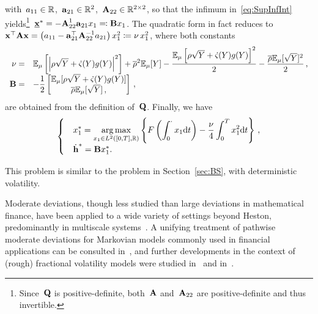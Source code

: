 with~$a_{11} \in\mathbb{R}$,~$\boldsymbol{\mathrm{a}}_{21}\in\mathbb{R}^{2}$,~$\boldsymbol{\mathrm{A}}_{22}\in\mathbb{R}^{2\times 2}$, so that the infimum in~\eqref{eq:SupInfInt} yields\footnote{Since~$\boldsymbol{\mathrm{Q}}$ is positive-definite, both~$\boldsymbol{\mathrm{A}}$ and~$\boldsymbol{\mathrm{A}}_{22}$ are positive-definite and thus invertible.}~${\underline{\boldsymbol{\mathrm{x}}}^{*} = - \boldsymbol{\mathrm{A}}_{22}^{1} \boldsymbol{\mathrm{a}}_{21} x_1 \eqqcolon \boldsymbol{\mathrm{B}} x_1}$. The quadratic form in fact reduces to~${\boldsymbol{\mathrm{x}}^\top \boldsymbol{\mathrm{A}} \boldsymbol{\mathrm{x}} = \left( a_{11} - \boldsymbol{\mathrm{a}}_{21}^\top \boldsymbol{\mathrm{A}}_{22}^{-1} a_{21} \right ) x_1^2 \coloneqq \nu\, x_1^2}$, where both constants
\begin{equation}\label{eq:ConstPDP}
\begin{array}{rl}
\nu = & \displaystyle 
\mathbb{E}_\mu\left[ \left| \rho\sqrt{Y} + \dot{\varsigma}(Y)g(Y)\right|^2 \right ] + \overline{\rho}^2\mathbb{E}_\mu[Y] - \frac{\mathbb{E}_\mu\left[ \rho\sqrt{Y} + \dot{\varsigma}(Y)g(Y)\right]^2}{2} - \frac{\overline{\rho}\mathbb{E}_\mu[\sqrt{Y}]^2}{2}\,, \\
\boldsymbol{\mathrm{B}} = & \displaystyle -\frac{1}{2}\begin{bmatrix}
\mathbb{E}_\mu[\rho\sqrt{Y}+\dot{\varsigma}(Y)g(Y)] \\
\overline{\rho}\mathbb{E}_\mu[\sqrt{Y}]\,,
\end{bmatrix}\,,
\end{array}
\end{equation}
are obtained from the definition of~$\boldsymbol{\mathrm{Q}}$. Finally, we have
\begin{equation}\label{pb-deterministic-large}
\begin{cases}
&\displaystyle x_1^{*}=\operatorname*{arg\,max}\limits_{x_1 \in L^2([0,T],\mathbb{R})}
\left\{F\left(\int_0^\cdot x_1\mathrm{d} t\right) - \frac{\nu}{4}\int_0^T x_1^2 \mathrm{d} t\right\}\,,
\\
&\dot{\boldsymbol{\mathrm{h}}}^{*}
= \boldsymbol{\mathrm{B}} x_1^{*}.
\end{cases}
\end{equation}
\begin{remark}
This problem is similar to the problem in Section~\ref{sec:BS}, with deterministic volatility.
\end{remark}

Moderate deviations, though less studied
than large deviations in mathematical finance,  
have been applied to a wide variety of settings beyond Heston, predominantly in multiscale systems~\cite{Morse2017ModerateDiffusions, Morse2020ImportanceDeviations}. 
A unifying treatment of pathwise moderate deviations for Markovian models commonly used in financial applications
can be consulted in~\cite{Jacquier2019PathwisePricing},
and further developments in the context of (rough) fractional volatility models 
were studied in~\cite{Bayer2018Short-timeModels} 
and in~\cite{Jacquier2022LargeSystems}.


